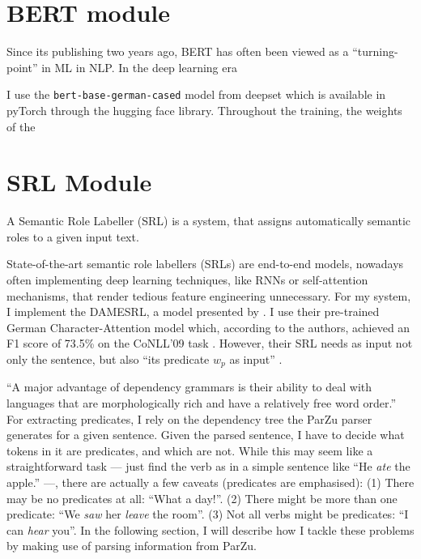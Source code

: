 \section{BERT module}

Since its publishing two years ago, BERT \citep{devlin2018bert} has often been viewed as a
``turning-point'' in ML in NLP. In the deep learning era

I use the \texttt{bert-base-german-cased} model from deepset which is available in pyTorch
through the hugging face library\cite{wolf2019transformers}.
Throughout the training, the weights of the

\section{SRL Module}

A Semantic Role Labeller (SRL) is a system, that assigns automatically semantic roles to a
given input text.

State-of-the-art semantic role labellers (SRLs) are end-to-end models, nowadays often
implementing deep learning techniques, like RNNs or self-attention mechanisms, that render
tedious feature engineering unnecessary.  For my system, I implement the DAMESRL, a model
presented by \cite{do2018flexible}.  I use their pre-trained German Character-Attention
model which, according to the authors, achieved an F1 score of 73.5\% on the CoNLL'09 task
\citep{hajivc2009conll}.  However, their SRL needs as input not only the sentence, but also
``its predicate $w_p$ as input'' \citep{do2018flexible}.

``A major advantage of dependency grammars is their ability to deal with languages that are
morphologically rich and have a relatively free word order.'' \citep[p.~274]{jurafsky2019speech}
For extracting predicates, I rely on the dependency tree the ParZu parser
\cite{sennrich2013exploiting} generates for a given sentence.  Given the parsed sentence, I
have to decide what tokens in it are predicates, and which are not.  While this may seem like
a straightforward task --- just find the verb as in a simple sentence like ``He \emph{ate}
the apple.'' ---, there are actually a few caveats (predicates are emphasised): (1) There
may be no predicates at all: ``What a day!''. (2) There might be more than one predicate:
``We \emph{saw} her \emph{leave} the room''. (3) Not all verbs might be predicates: ``I can
\emph{hear} you''.  In the following section, I will describe how I tackle these problems by
making use of parsing information from ParZu.

